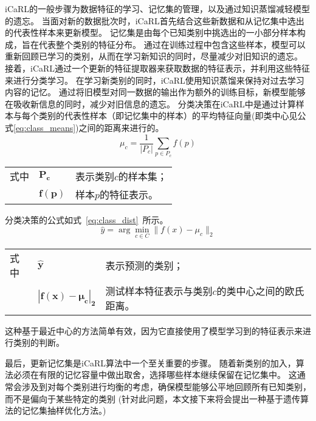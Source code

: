 iCaRL的一般步骤为数据特征的学习、记忆集的管理，以及通过知识蒸馏减轻模型的遗忘。
当面对新的数据批次时，iCaRL首先结合这些新数据和从记忆集中选出的代表性样本来更新模型。
记忆集是由每个已知类别中挑选出的一小部分样本构成，旨在代表整个类别的特征分布。
通过在训练过程中包含这些样本，模型可以重新回顾已学习的类别，从而在学习新知识的同时，尽量减少对旧知识的遗忘。
接着，iCaRL通过一个更新的特征提取器来获取数据的特征表示，并利用这些特征来进行分类学习。
在学习新类别的同时，iCaRL使用知识蒸馏来保持对过去学习内容的记忆。
通过将旧模型对同一数据的输出作为额外的训练目标，新模型能够在吸收新信息的同时，减少对旧信息的遗忘。
分类决策在iCaRL中是通过计算样本与每个类别的代表性样本（即记忆集中的样本）的平均特征向量(即类中心见公式\ref{eq:class_means})之间的距离来进行的。
\begin{equation}
  \label{eq:class_means}
  \mu_c = \frac{1}{|P_c|} \sum_{p \in P_c} f(p)
\end{equation}
\begin{flushleft}
  \renewcommand\arraystretch{1.25}
  \begin{tabularx}{\textwidth}{@{}>{\normalsize\rm}l@{\quad}>{\normalsize\rm}l@{——}>{\normalsize\rm}X@{}}
  式中& $\symbf{P_c}$ &表示类别$c$的样本集；\\
  &  $\symbf{f(p)}$&样本$p$的特征表示。\\
  \end{tabularx}\vspace{.5ex}%
\end{flushleft}
分类决策的公式如式~\ref{eq:class_dist}~所示。
\begin{equation}
  \label{eq:class_dist}
  \hat{y} = \arg\min_{c \in C} \|f(x) - \mu_c\|_2
\end{equation}
\begin{flushleft}
  \renewcommand\arraystretch{1.25}
  \begin{tabularx}{\textwidth}{@{}>{\normalsize\rm}l@{\quad}>{\normalsize\rm}l@{——}>{\normalsize\rm}X@{}}
  式中& $\symbf{\hat{y}}$ &表示预测的类别；\\
  &  $\symbf{|f(x) - \mu_c|_2}$&测试样本特征表示与类别$c$的类中心之间的欧氏距离。\\
  \end{tabularx}\vspace{.5ex}%
\end{flushleft}
这种基于最近中心的方法简单有效，因为它直接使用了模型学习到的特征表示来进行类别的判断。

最后，更新记忆集是iCaRL算法中一个至关重要的步骤。
随着新类别的加入，算法必须在有限的记忆容量中做出取舍，选择哪些样本继续保留在记忆集中。
这通常会涉及到对每个类别进行均衡的考虑，确保模型能够公平地回顾所有已知类别，而不是偏向于某些特定的类别
(针对此问题，本文接下来将会提出一种基于遗传算法的记忆集抽样优化方法。)

